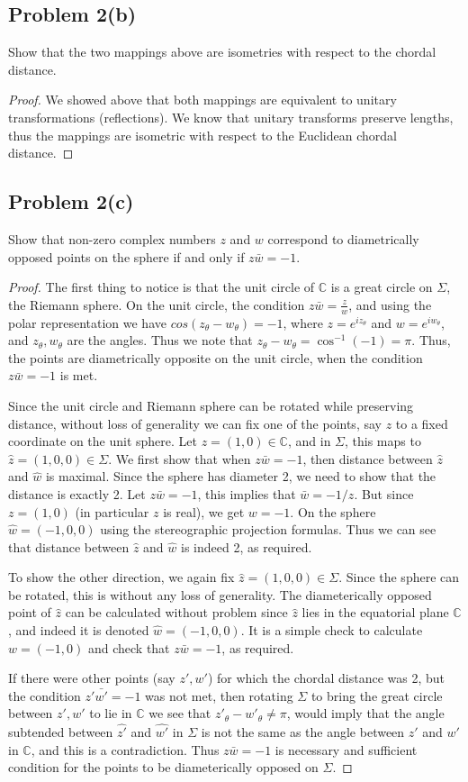 \documentclass{article}[12pt]
\newtheorem{proof}{Proof}
\def\CC{\mathbb C}
\begin{document}
\subsection{Problem 2(b)} Show that the two mappings above are 
isometries with respect to the chordal distance.
\begin{proof}
We showed above that both mappings are equivalent to unitary
transformations (reflections). We know that unitary transforms preserve
lengths, thus the mappings are isometric with respect to the Euclidean
chordal distance.
\end{proof}

\subsection{Problem 2(c)}
Show that non-zero complex numbers $z$ and $w$ correspond to 
diametrically opposed points on the sphere if and only if $z\bar{w}=-1$.
\begin{proof}
The first thing to notice is that the unit circle of $\CC$ is a great
circle on $\Sigma$, the Riemann sphere. On the unit circle, the
condition $z\bar{w}=\frac{z}{w}$, and using the polar representation
we have $cos(z_\theta-w_\theta)=-1$, where $z=e^{iz_\theta}$ and
$w=e^{iw_\theta}$, and $z_\theta,w_\theta$ are the angles. Thus we note
that $z_\theta-w_\theta = \cos^{-1}(-1)=\pi$. Thus, the points are
diametrically opposite on the unit circle, when the condition
$z\bar{w}=-1$ is met.

Since the unit circle and Riemann sphere can be rotated while
preserving distance, without loss of generality we can fix one
of the points, say $z$ to a fixed coordinate on the unit sphere.
Let $z=(1,0)\in \CC$, and in $\Sigma$, this maps to $\hat{z}=(1,0,0)\in \Sigma$.
We first show that when $z\bar{w}=-1$, then distance between 
$\hat{z}$ and $\hat{w}$ is maximal. Since the sphere has diameter 2, we
need to show that the distance is exactly 2. Let $z\bar{w}=-1$, this
implies that $\bar{w}=-1/z$. But since $z=(1,0)$ (in particular $z$ is real),
we get $w=-1$. On the sphere $\hat{w}=(-1,0,0)$ using the stereographic
projection formulas. Thus we can see that distance between $\hat{z}$ and
$\hat{w}$ is indeed 2, as required.

To show the other direction, we again fix $\hat{z}=(1,0,0)\in \Sigma$.
Since the sphere can be rotated, this is without any loss of generality.
The diameterically opposed point of $\hat{z}$ can be calculated without
problem since $\hat{z}$ lies in the equatorial plane $\CC$, and indeed
it is denoted $\hat{w}=(-1,0,0)$. It is a simple check to calculate
$w=(-1,0)$ and check that $z\bar{w}=-1$, as required.

If there were other points (say $z',w'$)
for which the chordal distance was 2, but
the condition $z'\bar{w'}=-1$ was not met,
then rotating $\Sigma$ to bring the great circle between $z',w'$ to lie
in $\CC$ we see that $z'_\theta-w'_\theta \ne \pi$, would imply that
the angle subtended between $\hat{z'}$ and $\hat{w'}$ in $\Sigma$
is not the same as the angle between $z'$ and $w'$ in $\CC$, and
this is a contradiction. Thus $z\bar{w}=-1$ is necessary and sufficient
condition for the points to be diameterically opposed on $\Sigma$.
\end{proof}
\end{document}
